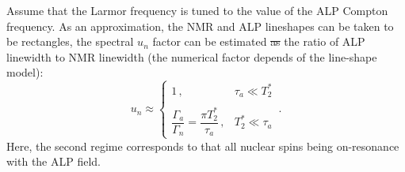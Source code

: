 \documentclass{WileyMSP-template}
\newcommand{\YZ}[1]{\textcolor{purple}{Yuzhe: #1}}
\newcommand{\HB}[1]{\textcolor{orange}{Hendrik: #1}}
\newcommand{\AW}[1]{\textcolor{cyan}{Arne: #1}}
\newcommand{\DA}[1]{\textcolor[HTML]{8DC73E}{Deniz: #1}}
\providecommand{\DIFaddtex}[1]{{\protect\color{blue}\uwave{#1}}} %
\providecommand{\DIFdeltex}[1]{{\protect\color{red}\sout{#1}}}                      %
\providecommand{\DIFaddbegin}{} %
\providecommand{\DIFaddend}{} %
\providecommand{\DIFdelbegin}{} %
\providecommand{\DIFdelend}{} %
\providecommand{\DIFadd}[1]{\texorpdfstring{\DIFaddtex{#1}}{#1}} %
\providecommand{\DIFdel}[1]{\texorpdfstring{\DIFdeltex{#1}}{}} %
\begin{document}
	Assume that the Larmor frequency is tuned to the value of the ALP Compton frequency. As an approximation, the NMR and ALP lineshapes can be taken to be rectangles, the spectral $u_n$ factor can be estimated \DIFdelbegin \DIFdel{as }\DIFdelend \DIFaddbegin \DIFadd{from }\DIFaddend the ratio of ALP linewidth to NMR linewidth (the numerical factor depends of the line-shape model):
	\begin{equation}
		u_n \approx \left\{
		\DIFdelbegin %
\DIFdelend \DIFaddbegin \begin{array}{cl}
			1\,,
			&  \tau_a \ll T_2^* \\
			& \\
			\dfrac{\Gamma_a }{ \Gamma_{n} } = \dfrac{\pi T_2^*}{\tau_a}\,,
			&  T_2^* \ll \tau_a
		\end{array}\DIFaddend  \right.
		\,.\label{eq:un}
	\end{equation}
	Here, the second regime corresponds to that all nuclear spins being on-resonance with the ALP field. 

	\DIFaddbegin 
\end{document}
